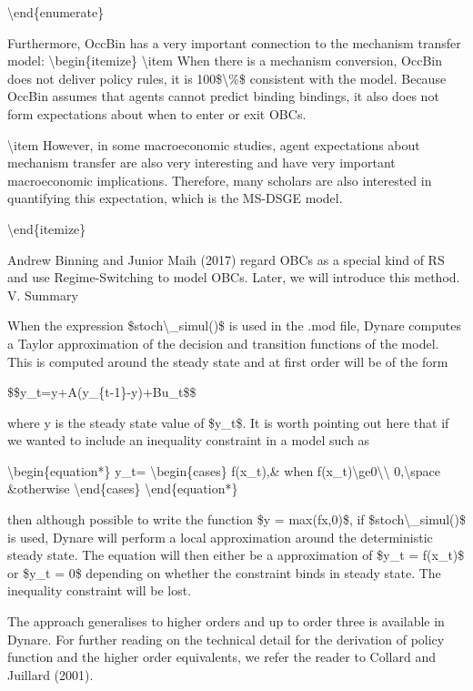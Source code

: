 \documentclass[10pt,math=newtx,citestyle=gb7714-2015,bibstyle=gb7714-2015]{elegantbook}
\begin{document}
	\textbackslash{}end\{enumerate\}
	
	
	Furthermore, OccBin has a very important connection to the mechanism transfer model:
	\textbackslash{}begin\{itemize\}
	\textbackslash{}item When there is a mechanism conversion, OccBin does not deliver policy rules, it is 100\$\textbackslash{}\%\$ consistent with the model. Because OccBin assumes that agents cannot predict binding bindings, it also does not form expectations about when to enter or exit OBCs.
	
	\textbackslash{}item However, in some macroeconomic studies, agent expectations about mechanism transfer are also very interesting and have very important macroeconomic implications. Therefore, many scholars are also interested in quantifying this expectation, which is the MS-DSGE model.
	
	\textbackslash{}end\{itemize\}
	
	Andrew Binning and Junior Maih (2017) regard OBCs as a special kind of RS and use Regime-Switching to model OBCs. Later, we will introduce this method.
	V. Summary
	
	When the expression \$stoch\textbackslash{}\_simul()\$ is used in the .mod file, Dynare computes a Taylor approximation of the decision and transition functions of the model. This is computed around the steady state and at first order will be of the form
	
	\$\$y\_t=y+A(y\_\{t-1\}-y)+Bu\_t\$\$
	
	where y is the steady state value of \$y\_t\$. It is worth pointing out here that if we wanted to include an inequality constraint in a model such as
	
	\textbackslash{}begin\{equation*\}
	y\_t=
	\textbackslash{}begin\{cases\}
	f(x\_t),\& when f(x\_t)\textbackslash{}ge0\textbackslash{}\textbackslash{}
	0,\textbackslash{}space \&otherwise
	\textbackslash{}end\{cases\}
	\textbackslash{}end\{equation*\}
	
	then although possible to write the function \$y = max(fx,0)\$, if \$stoch\textbackslash{}\_simul()\$ is used, Dynare will perform a local approximation around the deterministic steady state. The equation will then either be a approximation of \$y\_t = f(x\_t)\$ or \$y\_t = 0\$ depending on whether the constraint binds in steady state. The inequality constraint will be lost.
	
	The approach generalises to higher orders and up to order three is available in Dynare. For further reading on the technical detail for the derivation of policy function and the higher order equivalents, we refer the reader to Collard and Juillard (2001).
	
\end{document}
